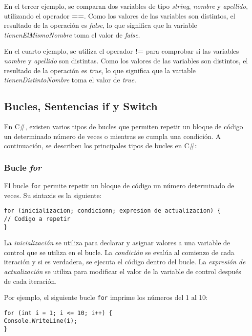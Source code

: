 \documentclass[executivepaper]{article}
\begin{document}
En el tercer ejemplo, se comparan dos variables de tipo \emph{string}, \emph{nombre} y \emph{apellido}, utilizando el operador \textbf{==}. Como los valores de las variables son distintos, el resultado de la operación es \emph{false}, lo que significa que la variable \emph{tienenElMismoNombre} toma el valor de \emph{false}.

En el cuarto ejemplo, se utiliza el operador \textbf{!=} para comprobar si las variables \emph{nombre} y \emph{apellido} son distintas. Como los valores de las variables son distintos, el resultado de la operación es \emph{true}, lo que significa que la variable \emph{tienenDistintoNombre} toma el valor de \emph{true}.

\subsection{Bucles, Sentencias if y Switch}

En C\#, existen varios tipos de bucles que permiten repetir un bloque de código un determinado número de veces o mientras se cumpla una condición. A continuación, se describen los principales tipos de bucles en C\#:

\subsubsection*{Bucle \emph{for}}

El bucle \verb|for| permite repetir un bloque de código un número determinado de veces. Su sintaxis es la siguiente:

\begin{lstlisting}
for (inicializacion; condicionn; expresion de actualizacion) {
// Codigo a repetir
}
\end{lstlisting}

La \emph{inicialización} se utiliza para declarar y asignar valores a una variable de control que se utiliza en el bucle. La \emph{condición} se evalúa al comienzo de cada iteración y si es verdadera, se ejecuta el código dentro del bucle. La \emph{expresión de actualización} se utiliza para modificar el valor de la variable de control después de cada iteración.

Por ejemplo, el siguiente bucle \verb|for| imprime los números del 1 al 10:

\begin{lstlisting}
for (int i = 1; i <= 10; i++) {
Console.WriteLine(i);
}
\end{lstlisting}
\end{document}
